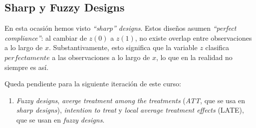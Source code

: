 \documentclass[10pt]{article}
\begin{document}
\subsection*{Sharp y Fuzzy Designs}

En esta ocasi\'on hemos visto \emph{``sharp'' designs}. Estos dise\~nos asumen \emph{``perfect compliance''}: al cambiar de $z(0)$ a $z(1)$, no existe overlap entre observaciones a lo largo de $x$. Substantivamente, esto significa que la variable $z$ clasifica $perfectamente$ a las observaciones a lo largo de $x$, lo que en la realidad no siempre es as\'i.

Queda pendiente para la siguiente iteraci\'on de este curso:

\begin{enumerate}
	\item \emph{Fuzzy designs}, \emph{averge treatment among the treatments} (\emph{ATT}, que se usa en \emph{sharp designs}), \emph{intention to treat} y \emph{local average treatment effects} (LATE), que se usan en \emph{fuzzy designs}.
\end{enumerate}
\end{document}
